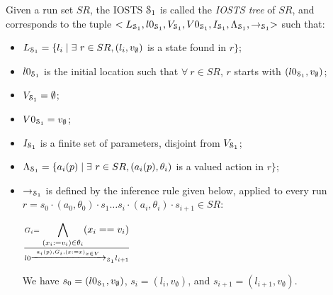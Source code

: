 \begin{definition}
    Given a run set $SR$, the IOSTS $\EuScript{S}_1$ is called
    the \emph{IOSTS tree} of $SR$, and corresponds to the tuple
    $<L_{\EuScript{S}_1}, l0_{\EuScript{S}_1},V_{\EuScript{S}_1},
    V0_{\EuScript{S}_1}, I_{\EuScript{S}_1},
    \Lambda_{\EuScript{S}_1},\rightarrow_{\EuScript{S}_1}>$ such
    that:

    \begin{itemize}

    \item $L_{\EuScript{S}_1}= \{l_i \mid \exists ~r \in SR,
        (l_i,v_\emptyset)$ is a state found in $r\}$;

    \item $l0_{\EuScript{S}_1}$ is the initial location such that
        $\forall ~r \in SR$, $r$ starts with
        $(l0_{\EuScript{S}_1},v_\emptyset)$;

    \item $V_{\EuScript{S}_1}=\emptyset$;

    \item $V0_{\EuScript{S}_1}=v_\emptyset$;

    \item $I_{\EuScript{S}_1}$ is a finite set of parameters,
        disjoint from $V_{\EuScript{S}_1}$;

    \item $\Lambda_{\EuScript{S}_1}= \{a_i(p) \mid \exists ~r \in SR,
        (a_i(p),\theta_i)$ is a valued action in $r\}$;

    \item $\rightarrow_{\EuScript{S}_1}$ is defined by the
        inference rule given below, applied to every run
        $r = s_0 \cdot (a_0,\theta_0) \cdot s_1 \dots
        s_i \cdot (a_i,\theta_i) \cdot s_{i+1} \in SR$:

        \begin{center}
            {\Large
            $\frac{G_i=\displaystyle \bigwedge_{(x_i:=v_i) \in
            \theta_i} (x_i==v_i)}
            {l0 \xrightarrow{a_i(p),G_i,(x:=x)_{x\in
            V}}_{\EuScript{S}_1} l_{i+1}}$
        }
        \end{center}

        We have $s_0 = (l0_{\EuScript{S}_1}, v_{\emptyset})$, $s_i = (l_i,
        v_{\emptyset})$, and $s_{i+1} = (l_{i+1}, v_{\emptyset})$.
    \end{itemize}

    \label{IOSTS_tree}
\end{definition}

